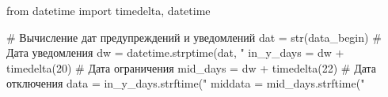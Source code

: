 \begin{pycode}	
from datetime import timedelta, datetime

# Вычисление дат предупреждений и уведомлений
dat = str(data_begin) # Дата уведомления
dw = datetime.strptime(dat, "%
in_y_days = dw + timedelta(20) # Дата ограничения
mid_days = dw + timedelta(22)  # Дата отключения 
data = in_y_days.strftime("%
middata = mid_days.strftime("%

\end{pycode}
